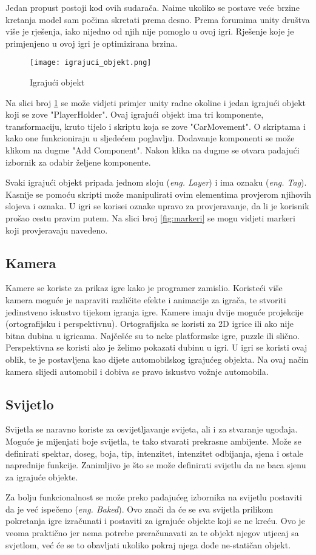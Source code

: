 Jedan propust postoji kod ovih sudarača. Naime ukoliko se postave veće brzine kretanja model sam počima skretati prema desno. Prema forumima unity društva više je rješenja, iako nijedno od njih nije pomoglo u ovoj igri. Rješenje koje je primjenjeno u ovoj igri je optimizirana brzina.

\begin{figure}[h]
	\texttt{[image: igrajuci\_objekt.png]}
	\centering
	\caption{Igrajući objekt}
	\label{fig:igrajuciobjekt}
\end{figure}
\newpage
Na slici broj \ref{fig:igrajuciobjekt} se može vidjeti primjer unity radne okoline i jedan igrajući objekt koji se zove "PlayerHolder". Ovaj igrajući objekt ima tri komponente, transformaciju, kruto tijelo i skriptu koja se zove "CarMovement". O skriptama i kako one funkcioniraju u sljedećem poglavlju. Dodavanje komponenti se može klikom na dugme "Add Component". Nakon klika na dugme se otvara padajući izbornik za odabir željene komponente. \par
Svaki igrajući objekt pripada jednom sloju (\emph{eng. Layer}) i ima oznaku (\emph{eng. Tag}). Kasnije se pomoću skripti može manipulirati ovim elementima provjerom njihovih slojeva i oznaka. U igri se korisei oznake upravo za provjeravanje, da li je korisnik prošao cestu pravim putem. Na slici broj \ref{fig:markeri} se mogu vidjeti markeri koji provjeravaju navedeno.
\subsection{Kamera}
Kamere se koriste za prikaz igre kako je programer zamislio. Koristeći više kamera moguće je napraviti različite efekte i animacije za igrača, te stvoriti jedinstveno iskustvo tijekom igranja igre. Kamere imaju dvije moguće projekcije (ortografijsku i perspektivnu). Ortografijska se koristi za 2D igrice ili ako nije bitna dubina u igricama. Najčešće su to neke platformske igre, puzzle ili slično. Perspektivna se koristi ako je želimo pokazati dubinu u igri. U igri se koristi ovaj oblik, te je postavljena kao dijete automobilskog igrajućeg objekta. Na ovaj način kamera slijedi automobil i dobiva se pravo iskustvo vožnje automobila.
\subsection{Svijetlo}
Svijetla se naravno koriste za osvijetljavanje svijeta, ali i za stvaranje ugođaja. Moguće je mijenjati boje svijetla, te tako stvarati prekrasne ambijente. Može se definirati spektar, doseg, boja, tip, intenzitet, intenzitet odbijanja, sjena i ostale naprednije funkcije. Zanimljivo je što se može definirati svijetlu da ne baca sjenu za igrajuće objekte. \par
Za bolju funkcionalnost se može preko padajućeg izbornika na svijetlu postaviti da je već ispečeno (\emph{eng. Baked}). Ovo znači da će se sva svijetla prilikom pokretanja igre izračunati i postaviti za igrajuće objekte koji se ne kreću. Ovo je veoma praktično jer nema potrebe preračunavati za te objekt njegov utjecaj sa svjetlom, već će se to obavljati ukoliko pokraj njega dođe ne-statičan objekt.
